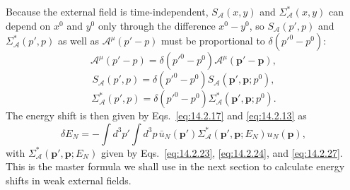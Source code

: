 Because the external field is time-independent, $S_{\mathcal A}(x,y)$ and
$\Sigma^*_{\mathcal A}(x,y)$ can depend on $x^0$ and $y^0$ only through the
difference $x^0-y^0$, so $S_{\mathcal A}(p',p)$ and
$\Sigma^*_{\mathcal A}(p',p)$ as well as $\mathcal A^\mu(p'-p)$ must be
proportional to $\delta(p'^0-p^0)$:
\begin{equation}
 \mathcal A^\mu(p'-p)=\delta(p'^0-p^0)\mathcal A^\mu(\mathbf p'-\mathbf p),
 \tag{14.2.25}\label{eq:14.2.25}
\end{equation}
\begin{equation}
 S_{\mathcal A}(p',p)=\delta(p'^0-p^0)S_{\mathcal A}(\mathbf p',\mathbf p;p^0),
 \tag{14.2.26}\label{eq:14.2.26}
\end{equation}
\begin{equation}
 \Sigma^*_{\mathcal A}(p',p)=\delta(p'^0-p^0)
 \Sigma^*_{\mathcal A}(\mathbf p',\mathbf p;p^0).
 \tag{14.2.27}\label{eq:14.2.27}
\end{equation}
The energy shift is then given by Eqs.~\eqref{eq:14.2.17} and
\eqref{eq:14.2.13} as
\begin{equation}
 \delta E_N=-\int d^3p'\int d^3p\,
 \bar u_N(\mathbf p')\Sigma^*_{\mathcal A}(\mathbf p',\mathbf p;E_N)u_N(\mathbf p),
 \tag{14.2.28}\label{eq:14.2.28}
\end{equation}
with $\Sigma^*_{\mathcal A}(\mathbf p',\mathbf p;E_N)$ given by
Eqs.~\eqref{eq:14.2.23}, \eqref{eq:14.2.24}, and \eqref{eq:14.2.27}. This is the
master formula we shall use in the next section to calculate energy shifts in
weak external fields.
